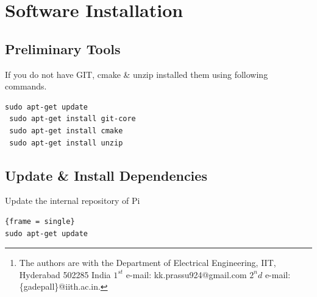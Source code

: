 \documentclass[journal,12pt,twocolumn]{IEEEtran}
\begin{document}

\title{}
 
%
%
%

\author{K Prasanna Kumar and G V V Sharma %
\thanks{The authors are with the Department
of Electrical Engineering, IIT, Hyderabad
502285 India $1^{st}$ e-mail:  kk.prassu924@gmail.com  $2^nd$ e-mail: \{gadepall\}@iith.ac.in. 
}}



\maketitle


\tableofcontents
\bigskip
\begin{abstract}
This module explains how to interface RTL-SDR dongle with Raspbery Pi and Demodulate FM Signal.
\end{abstract}
\section{Software Installation}
\subsection{Preliminary Tools }
If you do not have GIT, cmake \& unzip installed them using following commands.
\begin{lstlisting}[frame = single]
 sudo apt-get update
 sudo apt-get install git-core
 sudo apt-get install cmake
 sudo apt-get install unzip
\end{lstlisting}
\subsection{Update \& Install Dependencies}
Update the internal repository of Pi
\begin{lstlisting}{frame = single}
sudo apt-get update
\end{lstlisting}
\end{document}
